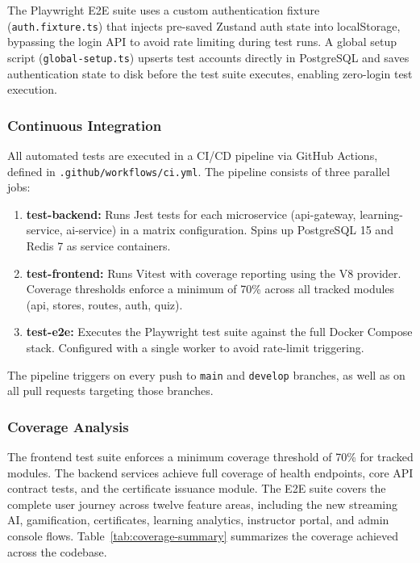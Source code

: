 The Playwright E2E suite uses a custom authentication fixture (\texttt{auth.fixture.ts}) that injects pre-saved Zustand auth state into localStorage, bypassing the login API to avoid rate limiting during test runs. A global setup script (\texttt{global-setup.ts}) upserts test accounts directly in PostgreSQL and saves authentication state to disk before the test suite executes, enabling zero-login test execution.

\subsubsection{Continuous Integration}

All automated tests are executed in a CI/CD pipeline via GitHub Actions, defined in \texttt{.github/workflows/ci.yml}. The pipeline consists of three parallel jobs:

\begin{enumerate}
    \item \textbf{test-backend:} Runs Jest tests for each microservice (api-gateway, learning-service, ai-service) in a matrix configuration. Spins up PostgreSQL 15 and Redis 7 as service containers.
    \item \textbf{test-frontend:} Runs Vitest with coverage reporting using the V8 provider. Coverage thresholds enforce a minimum of 70\% across all tracked modules (api, stores, routes, auth, quiz).
    \item \textbf{test-e2e:} Executes the Playwright test suite against the full Docker Compose stack. Configured with a single worker to avoid rate-limit triggering.
\end{enumerate}

The pipeline triggers on every push to \texttt{main} and \texttt{develop} branches, as well as on all pull requests targeting those branches.

\subsubsection{Coverage Analysis}

The frontend test suite enforces a minimum coverage threshold of 70\% for tracked modules. The backend services achieve full coverage of health endpoints, core API contract tests, and the certificate issuance module. The E2E suite covers the complete user journey across twelve feature areas, including the new streaming AI, gamification, certificates, learning analytics, instructor portal, and admin console flows. Table~\ref{tab:coverage-summary} summarizes the coverage achieved across the codebase.

